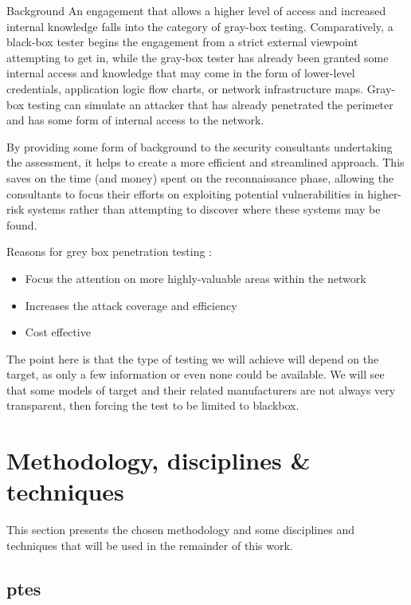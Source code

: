 \begin{chaptercover}{Background}
An engagement that allows a higher level of access and increased internal knowledge falls into the category of gray-box testing. Comparatively, a black-box tester begins the engagement from a strict external viewpoint attempting to get in, while the gray-box tester has already been granted some internal access and knowledge that may come in the form of lower-level credentials, application logic flow charts, or network infrastructure maps. Gray-box testing can simulate an attacker that has already penetrated the perimeter and has some form of internal access to the network.

By providing some form of background to the security consultants undertaking the assessment, it helps to create a more efficient and streamlined approach. This saves on the time (and money) spent on the reconnaissance phase, allowing the consultants to focus their efforts on exploiting potential vulnerabilities in higher-risk systems rather than attempting to discover where these systems may be found.

Reasons for grey box penetration testing :
\begin{itemize} \vspace{-.2cm}
  \item[\checkmark] Focus the attention on more highly-valuable areas within the network
  \item[\checkmark] Increases the attack coverage and efficiency
  \item[\checkmark] Cost effective
\end{itemize}

\begin{tip} \hyphenation{}
The point here is that the type of testing we will achieve will depend on the target, as only a few information or even none could be available. We will see that some models of target and their related manufacturers are not always very transparent, then forcing the test to be limited to blackbox.
\end{tip}

\section{Methodology, disciplines \& techniques}

This section presents the chosen methodology and some disciplines and techniques that will be used in the remainder of this work.

\subsection{\acrlong{ptes}}


\end{chaptercover}
